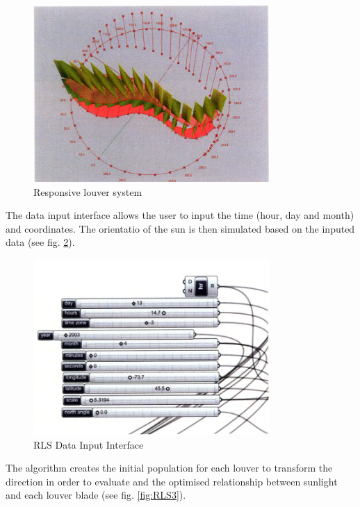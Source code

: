 \begin{figure}[htbp]
\centering
\includegraphics[width=0.8\textwidth]{./Images/32-RLS1}
\caption[Responsive Louver System]{Responsive louver system \cite{yi09}}
\label{fig:RLS1}
\end{figure}

The data input interface allows the user to input the time (hour, day and month) and coordinates. The orientatio of the sun is then simulated based on the inputed data (see fig. \ref{fig:RLS2}).

\begin{figure}[htbp]
\centering
\includegraphics[width=0.8\textwidth]{./Images/33-RLS2}
\caption[RLS Data Input Interface]{RLS Data Input Interface \cite{yi09}}
\label{fig:RLS2}
\end{figure}

The algorithm creates the initial population for each louver to transform the direction in order to evaluate and the optimised relationship between sunlight and each louver blade (see fig. \ref{fig:RLS3}).

